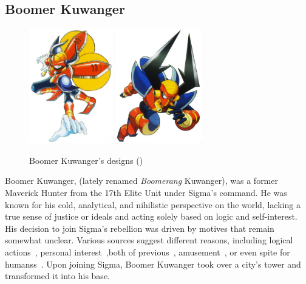\subsection{Boomer Kuwanger}\label{boss:Boomer_Kuwanger}
\begin{figure}[htp]
	\centering
	\includegraphics[height=5cm]{figures/X1/Boomer_kuwanger/Boomer_kuwanger.jpg}
	\includegraphics[height=5cm]{figures/X1/Boomer_kuwanger/MHXBoomerKuwanger.jpg}
	\caption{Boomer Kuwanger's designs (\cite{book:MMX_Complete_art})}
\end{figure}

Boomer Kuwanger,  (lately renamed \emph{Boomerang} Kuwanger), was a former Maverick Hunter from the 17th Elite Unit under Sigma's command. He was known for his cold, analytical, and nihilistic perspective on the world, lacking a true sense of justice or ideals and acting solely based on logic and self-interest. His decision to join Sigma's rebellion was driven by motives that remain somewhat unclear. Various sources suggest different reasons, including logical actions~\cite{MHX:manual}, personal interest~\cite{wiki:Boomer_kuwanger},both of previous~\cite{book:MH_field_guide}, amusement~\cite{Xcoll1:Manual_X1}, or even spite for humanss~\cite{wayback:X_resources}. Upon joining Sigma, Boomer Kuwanger took over a city's tower and transformed it into his base.

